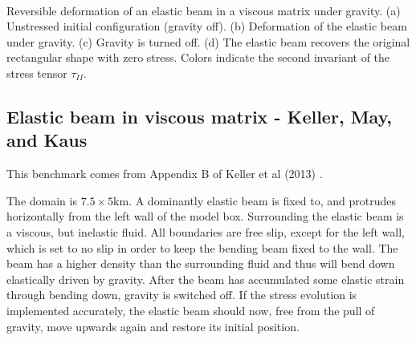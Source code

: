 \begin{center}
\\
{\captionfont 
Reversible deformation of an elastic beam in a viscous matrix under gravity. 
(a) Unstressed initial configuration (gravity off). 
(b) Deformation of the elastic beam under gravity. 
(c) Gravity is turned off. (d) The elastic beam recovers the original rectangular 
shape with zero stress. Colors indicate the second invariant of the stress 
tensor $\tau_{II}$.}
\end{center}



\subsection{Elastic beam in viscous matrix - Keller, May, and Kaus}


This benchmark comes from Appendix B of Keller et al (2013) \cite{kemk13}.

The domain is $7.5\times5$km. A dominantly elastic beam is fixed to, and protrudes horizontally 
from the left wall of the model box. 
Surrounding the elastic beam is a viscous, but inelastic fluid. 
All boundaries are free slip, except for the left wall, which is set to no slip in  
order to keep the bending beam fixed to the wall. The beam has a higher density than the surrounding fluid and 
thus will bend down elastically driven by gravity. After the beam has 
accumulated some elastic strain through bending down, gravity is switched off. 
If the stress evolution is implemented accurately, the elastic beam should now, 
free from the pull of gravity, move upwards again and restore its initial position. 

